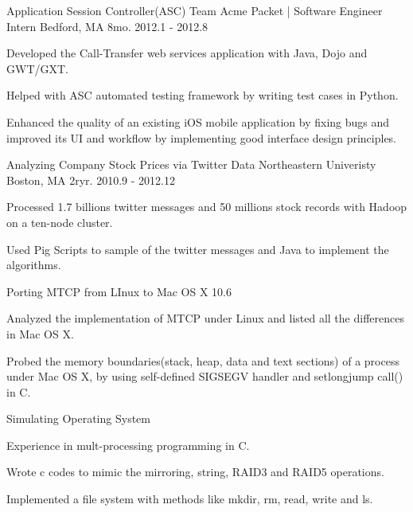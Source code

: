 \begin{cventries}
\cventry
{Application Session Controller(ASC) Team} %
{Acme Packet | Software Engineer Intern} %
{Bedford, MA} %
{8mo. 2012.1 - 2012.8} %
{ %
\begin{cvitems}
\item { Developed the Call-Transfer web services application with Java, Dojo and GWT/GXT.}
\item { Helped with ASC automated testing framework by writing test cases in Python.}
\item { Enhanced the quality of an existing iOS mobile application by fixing bugs and improved its UI and workflow by implementing good interface design principles.}
\end{cvitems}
}


\cventry
{Analyzing Company Stock Prices via Twitter Data} %
{Northeastern Univeristy} %
{Boston, MA} %
{2ryr. 2010.9 - 2012.12} %
{ %
\begin{cvitems}
\item {Processed 1.7 billions twitter messages and 50 millions stock records with Hadoop on a ten-node cluster.}
\item {Used Pig Scripts to sample of the twitter messages and Java to implement the algorithms.}
\end{cvitems}
}

\cventry
{Porting MTCP from LInux to Mac OS X 10.6} %
{} %
{} %
{} %
{ %
\begin{cvitems}
\item {Analyzed the implementation of MTCP under Linux and listed all the differences in Mac OS X.}
\item {Probed the memory boundaries(stack, heap, data and text sections) of a process under Mac OS X, by using self-defined SIGSEGV handler and setlongjump call() in C.}
\end{cvitems}
}

\cventry
{Simulating Operating System} %
{} %
{} %
{} %
{ %
\begin{cvitems}
\item {Experience in mult-processing programming in C.}
\item {Wrote c codes to mimic the mirroring, string, RAID3 and RAID5 operations.}
\item {Implemented a file system with methods like mkdir, rm, read, write and ls.}
\end{cvitems}
}


\end{cventries}
